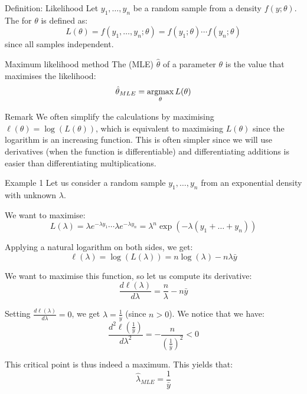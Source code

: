 \documentclass[a4paper]{article}
\begin{document}
\begin{parag}{Definition: Likelihood}
    Let $y_1, \ldots, y_n$ be a random sample from a density $f\left(y; \theta\right)$. The  for $\theta$ is defined as: 
    \[L\left(\theta\right) = f\left(y_1, \ldots, y_n; \theta\right)=  f\left(y_1;\theta\right) \cdots f\left(y_n; \theta\right)\]
    since all samples independent.
\end{parag}


\begin{parag}{Maximum likelihood method}
    The  (MLE) $\hat{\theta}$ of a parameter $\theta$ is the value that maximises the likelihood: 
    \[\hat{\theta}_{MLE} = \argmax_{\theta} L\left(\theta\right)\]

    \begin{subparag}{Remark}
        We often simplify the calculations by maximising $\ell \left(\theta\right) = \log\left(L\left(\theta\right)\right)$, which is equivalent to maximising $L\left(\theta\right)$ since the logarithm is an increasing function. This is often simpler since we will use derivatives (when the function is differentiable) and differentiating additions is easier than differentiating multiplications.
    \end{subparag}
\end{parag}

\begin{parag}{Example 1}
    Let us consider a random sample $y_1, \ldots, y_n$ from an exponential density with unknown $\lambda$.

    We want to maximise: 
    \[L\left(\lambda\right) = \lambda e^{-\lambda y_1} \cdots \lambda e^{-\lambda y_n} = \lambda^n \exp\left(-\lambda\left(y_1 + \ldots + y_n\right)\right)\]
    
    Applying a natural logarithm on both sides, we get: 
    \[\ell \left(\lambda\right) = \log\left(L\left(\lambda\right)\right) = n \log\left(\lambda\right) - n \lambda \bar{y}\]
    
    We want to maximise this function, so let us compute its derivative: 
    \[\frac{d \ell \left(\lambda\right)}{d \lambda} = \frac{n}{\lambda} - n \bar{y}\]
    
    Setting $\frac{d \ell \left(\lambda\right)}{d \lambda} = 0$, we get $\lambda = \frac{1}{\bar{y}}$ (since $n > 0$). We notice that we have: 
    \[\frac{d^2 \ell \left(\frac{1}{\bar{y}}\right)}{d \lambda^2} = -\frac{n}{\left(\frac{1}{\bar{y}}\right)^2} < 0\]
    
    This critical point is thus indeed a maximum. This yields that: 
    \[\hat{\lambda}_{MLE} = \frac{1}{\bar{y}}\]
\end{parag}
\end{document}
